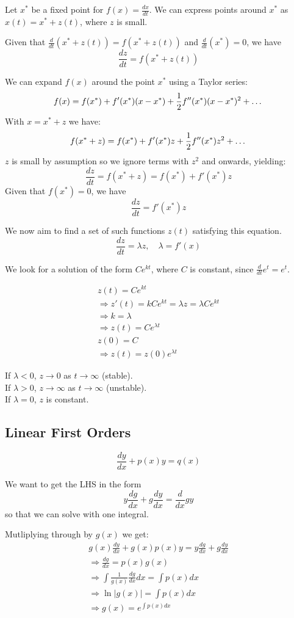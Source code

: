 \documentclass[a4paper,10pt]{article}
\begin{document}
Let $x^*$ be a fixed point for $f(x) = \frac{dx}{dt}$. We can express
points around $x^*$ as $x(t) = x^* + z(t)$, where $z$ is small.

Given that $\frac{d}{dt}(x^* + z(t)) = f(x^* + z(t))$ and
$\frac{d}{dt}(x^*) = 0$, we have
\[
	\frac{dz}{dt} = f(x^* + z(t))
\]

We can expand $f(x)$ around the point $x^*$ using a Taylor series:
\[
	f(x) = f(x^*) + f'(x^*)(x - x^*) + \frac{1}{2}f''(x^*)(x - x^*)^2 + \dots \\
\]
With $x = x^* + z$ we have:
\[
	f(x^* + z) = f(x^*) + f'(x^*)z + \frac{1}{2}f''(x^*)z^2 + \dots \\
\]
$z$ is small by assumption so we ignore terms with $z^2$ and onwards, yielding:
\[
	\frac{dz}{dt} = f(x^* + z) = f(x^*) + f'(x^*)z
\]
Given that $f(x^*) = 0$, we have
\[
	\frac{dz}{dt} = f'(x^*)z
\]

We now aim to find a set of such functions $z(t)$ satisfying this equation.
\[
	\frac{dz}{dt} = \lambda z, \quad \lambda = f'(x)
\]

We look for a solution of the form $Ce^{kt}$, where $C$ is constant,
since $\frac{d}{dt} e^t = e^t$.

\begin{gather*}
	z(t) = Ce^{kt} \\
	\Rightarrow z'(t) = kCe^{kt} = \lambda z = \lambda Ce^{kt} \\
	\Rightarrow k = \lambda \\
	\Rightarrow z(t) = Ce^{\lambda t} \\
	z(0) = C \\
	\Rightarrow z(t) = z(0)e^{\lambda t}
\end{gather*}

If $\lambda < 0$, $z \to 0$ as $t \to \infty$ (stable). \\
If $\lambda > 0$, $z \to \infty$ as $t \to \infty$ (unstable). \\
If $\lambda = 0$, $z$ is constant.

\subsection{Linear First Orders}

\[
	\frac{dy}{dx} + p(x)y = q(x)
\]

We want to get the LHS in the form
\[
	y\frac{dg}{dx} + g\frac{dy}{dx} = \frac{d}{dx} gy
\]
so that we can solve with one integral.

Mutliplying through by $g(x)$ we get:
\begin{gather*}
	g(x)\frac{dy}{dx} + g(x)p(x)y = y\frac{dg}{dx} + g\frac{dy}{dx} \\
	\Rightarrow \frac{dg}{dx} = p(x)g(x) \\
	\Rightarrow \int \frac{1}{g(x)} \frac{dg}{dx} dx = \int p(x) dx \\
	\Rightarrow \ln |g(x)| = \int p(x) dx \\
	\Rightarrow g(x) = e^{\int p(x) dx}
\end{gather*}
\end{document}
